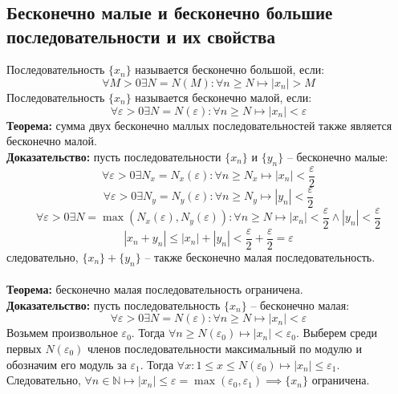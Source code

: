 \documentclass{article}
\begin{document}
    \newpage

    \section{}
    \subsection*{Бесконечно малые и бесконечно большие последовательности и их свойства}
        Последовательность $\{x_n\}$ называется бесконечно большой, если:
        \[ \forall M > 0 \exists N = N(M): \forall n \ge N \longmapsto |x_n| > M \]
        Последовательность $\{x_n\}$ называется бесконечно малой, если:
        \[ \forall \varepsilon > 0 \exists N = N(\varepsilon): \forall n \ge N \longmapsto |x_n| < \varepsilon \]
        \textbf{Теорема:} сумма двух бесконечно маллых последовательностей также является бесконечно малой.
        \\
        \textbf{Доказательство:}
        пусть последовательности $\{x_n\}$ и $\{y_n\}$ -- бесконечно малые:
        \[ \forall \varepsilon > 0 \exists N_x = N_x(\varepsilon): \forall n \ge N_x \longmapsto |x_n| < \frac{\varepsilon}{2} \]
        \[ \forall \varepsilon > 0 \exists N_y = N_y(\varepsilon): \forall n \ge N_y \longmapsto |y_n| < \frac{\varepsilon}{2} \]
        \[ \forall \varepsilon > 0 \exists N = \max (N_x(\varepsilon), N_y(\varepsilon)): \forall n \ge N \longmapsto |x_n| < \frac{\varepsilon}{2} \wedge |y_n| < \frac{\varepsilon}{2} \]
        \[ |x_n + y_n| \le |x_n| + |y_n| < \frac{\varepsilon}{2} + \frac{\varepsilon}{2} = \varepsilon \]
        следовательно, $\{x_n\} + \{y_n\}$ -- также бесконечно малая последовательность.
        \\
        \\
        \textbf{Теорема:} бесконечно малая последовательность ограничена.
        \\
        \textbf{Доказательство:}
        пусть последовательность $\{x_n\}$ -- бесконечно малая:
        \[ \forall \varepsilon > 0 \exists N = N(\varepsilon): \forall n \ge N \longmapsto |x_n| < \varepsilon \]
        Возьмем произвольное $\varepsilon_0$. Тогда $\forall n \ge N(\varepsilon_0) \longmapsto |x_n| < \varepsilon_0$.
        Выберем среди первых $N(\varepsilon_0)$ членов последовательности максимальный по модулю и обозначим его модуль за $\varepsilon_1$.
        Тогда $\forall x: 1 \le x \le N(\varepsilon_0) \longmapsto |x_n| \le \varepsilon_1$.
        Следовательно, $\forall n \in \mathbb{N} \longmapsto |x_n| \le \varepsilon = \max(\varepsilon_0, \varepsilon_1) \implies \{x_n\}$ ограничена.
\end{document}
